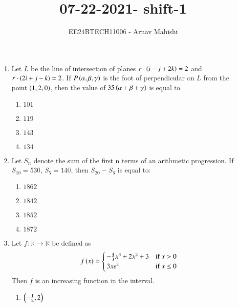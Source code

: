 \documentclass[journal]{IEEEtran}
\begin{document}

\vspace{3cm}

\title{07-22-2021- shift-1}
\author{EE24BTECH11006 - Arnav Mahishi}
{\let\newpage\relax\maketitle}
\begin{enumerate}
\item{
Let $L$ be the line of intersection of planes $r\cdot\left(i-j+2k\right) = 2$ and $r \cdot\left(2i + j - k\right) = 2$. If $P\left(\alpha, \beta, \gamma\right)$ is the foot of perpendicular on $L$ from the point $\left(1, 2, 0\right)$, then the value of $35\left(\alpha + \beta + \gamma\right)$ is equal to
\begin{multicols}{4}
\begin{enumerate}
\item$101$
\item$119$
\item$143$
\item$134$
\end{enumerate}
\end{multicols}
}
\item{
Let $S_n$ denote the sum of the first n terms of an arithmetic progression. If $S_{10} = 530$, $S_5 = 140$, then 
$S_{20} - S_6$ is equal to:
\begin{multicols}{4}
\begin{enumerate}
\item $1862$
\item $1842$
\item $1852$
\item $1872$
\end{enumerate}
\end{multicols}}
\item{
Let $f : \mathbb{R} \rightarrow \mathbb{R}$ be defined as
\[ f\left(x\right) = \begin{cases} 
-\frac{4}{3}x^3 + 2x^2 + 3 & \text{if } x > 0 \\
3xe^x & \text{if } x \leq 0 
\end{cases} \]
Then $f$ is an increasing function in the interval.
\begin{multicols}{4}
\begin{enumerate}
\item $\left(-\frac{1}{2}, 2\right)$

\end{enumerate}
\end{multicols}}
\end{enumerate}
\end{document}
